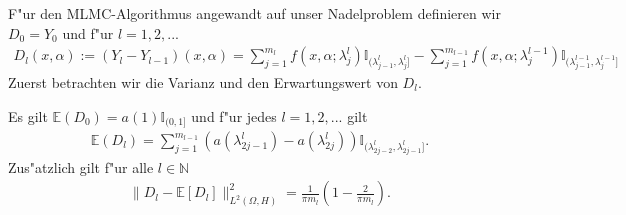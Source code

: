 F"ur den MLMC-Algorithmus angewandt auf unser Nadelproblem definieren wir $D_0=Y_0$ und f"ur $l=1,2,...$
\begin{align*}
D_l(x,\alpha):=(Y_l-Y_{l-1})(x,\alpha)=\sum_{j=1}^{m_l} f(x,\alpha;\lambda_j^l)\mathbb{I}_{(\lambda_{j-1}^l,\lambda_j^l]}-\sum_{j=1}^{m_{l-1}}f(x,\alpha;\lambda_j^{l-1})\mathbb{I}_{(\lambda_{j-1}^{l-1},\lambda_j^{l-1}]}
\end{align*}
Zuerst betrachten wir die Varianz und den Erwartungswert von $D_l$.
\newpage
\begin{prop}\label{k}
Es gilt $\mathbb{E}(D_0)=a(1)\mathbb{I}_{(0,1]}$ und f"ur jedes $l=1,2,...$ gilt
\begin{align*}
\mathbb{E}(D_l)=\sum_{j=1}^{m_{l-1}}(a(\lambda_{2j-1}^l)-a(\lambda_{2j}^l))\mathbb{I}_{(\lambda_{2j-2}^l,\lambda_{2j-1}^l]}.
\end{align*}
Zus"atzlich gilt f"ur alle $l\in\mathbb{N}$
\begin{align*}
\|D_l-\mathbb{E}[D_l]\|^2_{L^2(\Omega,H)}=\frac{1}{\pi m_l}\left(1-\frac{2}{\pi m_l}\right).
\end{align*}
\end{prop}
